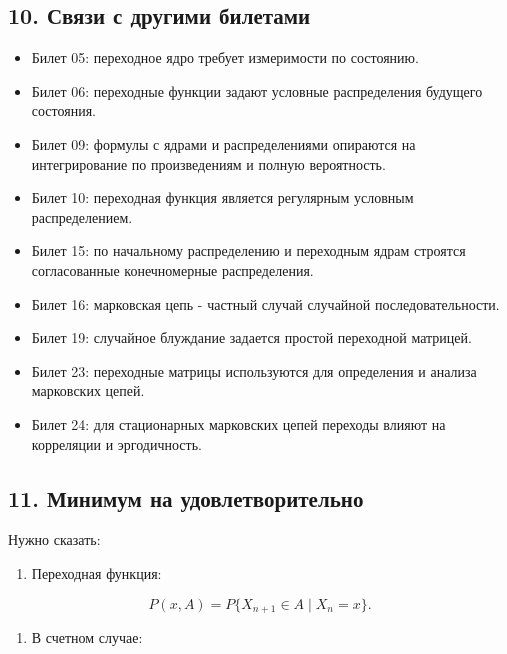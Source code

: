 \documentclass[
  11pt,
  a4paper,
]{article}
\providecommand{\tightlist}{%
  \setlength{\itemsep}{0pt}\setlength{\parskip}{0pt}}
\begin{document}
\subsection{10. Связи с другими
билетами}\label{ux441ux432ux44fux437ux438-ux441-ux434ux440ux443ux433ux438ux43cux438-ux431ux438ux43bux435ux442ux430ux43cux438}

\begin{itemize}
\tightlist
\item
  Билет 05: переходное ядро требует измеримости по состоянию.
\item
  Билет 06: переходные функции задают условные распределения будущего
  состояния.
\item
  Билет 09: формулы с ядрами и распределениями опираются на
  интегрирование по произведениям и полную вероятность.
\item
  Билет 10: переходная функция является регулярным условным
  распределением.
\item
  Билет 15: по начальному распределению и переходным ядрам строятся
  согласованные конечномерные распределения.
\item
  Билет 16: марковская цепь - частный случай случайной
  последовательности.
\item
  Билет 19: случайное блуждание задается простой переходной матрицей.
\item
  Билет 23: переходные матрицы используются для определения и анализа
  марковских цепей.
\item
  Билет 24: для стационарных марковских цепей переходы влияют на
  корреляции и эргодичность.
\end{itemize}

\subsection{11. Минимум на
удовлетворительно}\label{ux43cux438ux43dux438ux43cux443ux43c-ux43dux430-ux443ux434ux43eux432ux43bux435ux442ux432ux43eux440ux438ux442ux435ux43bux44cux43dux43e}

Нужно сказать:

\begin{enumerate}
\def\labelenumi{\arabic{enumi}.}
\tightlist
\item
  Переходная функция:
\end{enumerate}

\[
P(x,A)=P\{X_{n+1}\in A\mid X_n=x\}.
\]

\begin{enumerate}
\def\labelenumi{\arabic{enumi}.}
\setcounter{enumi}{1}
\tightlist
\item
  В счетном случае:
\end{enumerate}
\end{document}
